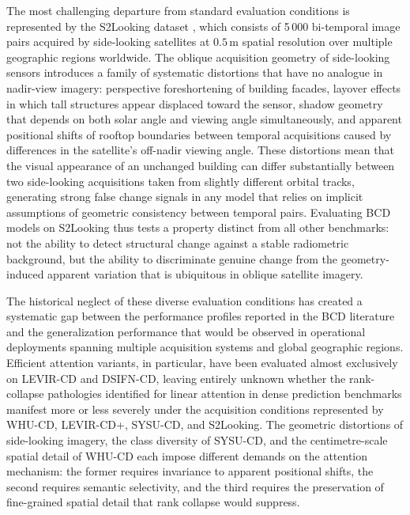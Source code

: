 The most challenging departure from standard evaluation conditions is
represented by the S2Looking dataset \cite{ShenS2Looking2021}, which consists
of 5\,000 bi-temporal image pairs acquired by side-looking satellites at
$0.5\,\mathrm{m}$ spatial resolution over multiple geographic regions
worldwide. The oblique acquisition geometry of side-looking sensors introduces
a family of systematic distortions that have no analogue in nadir-view imagery:
perspective foreshortening of building facades, layover effects in which tall
structures appear displaced toward the sensor, shadow geometry that depends on
both solar angle and viewing angle simultaneously, and apparent positional
shifts of rooftop boundaries between temporal acquisitions caused by differences
in the satellite's off-nadir viewing angle. These distortions mean that the
visual appearance of an unchanged building can differ substantially between two
side-looking acquisitions taken from slightly different orbital tracks,
generating strong false change signals in any model that relies on implicit
assumptions of geometric consistency between temporal pairs. Evaluating BCD
models on S2Looking thus tests a property distinct from all other benchmarks:
not the ability to detect structural change against a stable radiometric
background, but the ability to discriminate genuine change from the
geometry-induced apparent variation that is ubiquitous in oblique satellite
imagery.

The historical neglect of these diverse evaluation conditions has created a
systematic gap between the performance profiles reported in the BCD literature
and the generalization performance that would be observed in operational
deployments spanning multiple acquisition systems and global geographic regions.
Efficient attention variants, in particular, have been evaluated almost
exclusively on LEVIR-CD and DSIFN-CD, leaving entirely unknown whether the
rank-collapse pathologies identified for linear attention in dense prediction
benchmarks manifest more or less severely under the acquisition conditions
represented by WHU-CD, LEVIR-CD+, SYSU-CD, and S2Looking. The geometric
distortions of side-looking imagery, the class diversity of SYSU-CD, and the
centimetre-scale spatial detail of WHU-CD each impose different demands on the
attention mechanism: the former requires invariance to apparent positional
shifts, the second requires semantic selectivity, and the third requires the
preservation of fine-grained spatial detail that rank collapse would suppress.


